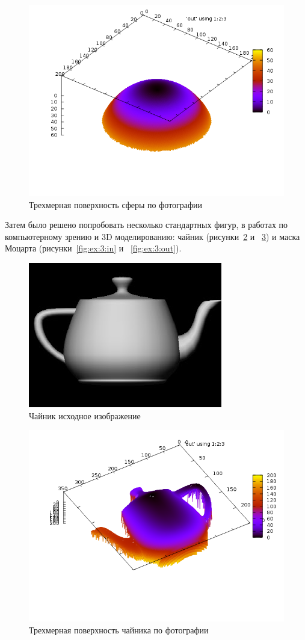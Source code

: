 \documentclass[a4paper,12pt]{article}
\begin{document}
\begin{figure}[H]
  \centering
  \includegraphics[width=0.5\linewidth]{img/sphere.png}
  \hfil \caption{Трехмерная поверхность сферы по фотографии}
  \label{fig:ex:1:out}
\end{figure}

Затем было решено попробовать несколько стандартных фигур, в работах
по компьютерному зрению и 3D моделированию: чайник
(рисунки~\ref{fig:ex:2:in} и ~\ref{fig:ex:2:out}) и маска Моцарта
(рисунки~\ref{fig:ex:3:in} и ~\ref{fig:ex:3:out}).

\begin{figure}[H]
  \centering
  \includegraphics[width=0.5\linewidth]{img/teapot_in.jpg}
  \hfil \caption{Чайник исходное изображение}
  \label{fig:ex:2:in}
\end{figure}

\begin{figure}[H]
  \centering
  \includegraphics[width=0.5\linewidth]{img/teapot.png}
  \hfil \caption{Трехмерная поверхность чайника по фотографии}
  \label{fig:ex:2:out}
\end{figure}
\end{document}
